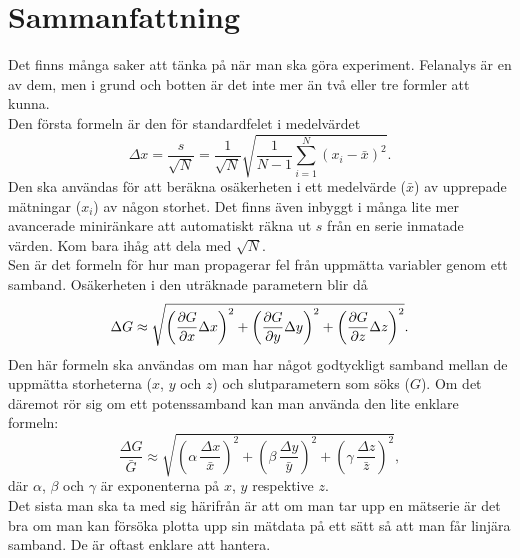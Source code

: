 \documentclass[11pt,a4paper, swedish
]{article}
\begin{document}

% 

\newpage
\section{Sammanfattning}
Det finns många saker att tänka på när man ska göra
experiment. Felanalys är en av dem, men i grund och botten är det inte
mer än två eller tre formler att kunna. 
\\[16pt]
Den första formeln är den för standardfelet i medelvärdet
\[
\Delta{x} = \frac{s}{\sqrt{N}} 
= \frac{1}{\sqrt{N}}\sqrt{\frac{1}{N-1}\sum_{i=1}^N (x_i-\bar{x})^2}.
\]
Den ska användas för att beräkna osäkerheten i ett medelvärde
($\bar{x}$) av upprepade mätningar ($x_i$) av någon storhet. Det finns
även inbyggt i många lite mer avancerade miniränkare att automatiskt
räkna ut $s$ från en serie inmatade värden. Kom bara ihåg att dela med
$\sqrt{N}$. 
\\[16pt]
Sen är det formeln för hur man propagerar fel från uppmätta variabler
genom ett samband. Osäkerheten i den uträknade parametern blir då
\[
\Delta{G} \approx \sqrt{
\left(\pdv{G}{x}\Delta{x}\right)^2
+\left(\pdv{G}{y}\Delta{y}\right)^2
+\left(\pdv{G}{z}\Delta{z}\right)^2
}.
\]
Den här formeln ska användas om man har något godtyckligt samband
mellan de uppmätta storheterna ($x$, $y$ och $z$) och slutparametern
som söks ($G$). Om det däremot rör sig om ett potenssamband kan man
använda den lite enklare formeln:
\[
\frac{\Delta{G}}{\bar{G}} \approx \sqrt{
\left(\alpha\,\frac{\Delta{x}}{\bar{x}}\right)^2
+\left(\beta\,\frac{\Delta{y}}{\bar{y}}\right)^2
+\left(\gamma\,\frac{\Delta{z}}{\bar{z}}\right)^2
},
\]
där $\alpha$, $\beta$ och $\gamma$ är exponenterna på $x$, $y$
respektive $z$.
\\[16pt]
Det sista man ska ta med sig härifrån är att om man tar upp en
mätserie är det bra om man kan försöka plotta upp sin mätdata på ett
sätt så att man får linjära samband. De är oftast enklare att hantera. 
\end{document}
